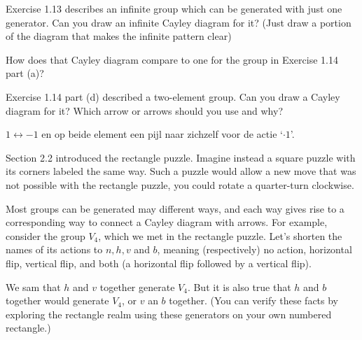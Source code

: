 \documentclass[11pt]{exam}
\begin{document}
\begin{questions}
	\question Exercise 1.13 describes an infinite group which can be generated with just one generator. Can you draw an infinite Cayley diagram for it? (Just draw a portion of the diagram that makes the infinite pattern clear)
	\par How does that Cayley diagram compare to one for the group in Exercise 1.14 part (a)?
	
	\question Exercise 1.14 part (d) described a two-element group. Can you draw a Cayley diagram for it? Which arrow or arrows should you use and why?
	\begin{solution}
		\par $1 \leftrightarrow -1$ en op beide element een pijl naar zichzelf voor de actie `$\cdot 1$'.
	\end{solution}

	\question Section 2.2 introduced the rectangle puzzle. Imagine instead a square puzzle with its corners labeled the same way. Such a puzzle would allow a new move that was not possible with the rectangle puzzle, you could rotate a quarter-turn clockwise.
	
	\question Most groups can be generated may different ways, and each way gives rise to a corresponding way to connect a Cayley diagram with arrows. For example, consider the group $V_4$, which we met in the rectangle puzzle. Let's shorten the names of its actions to $n, h, v$ and $b$, meaning (respectively) no action, horizontal flip, vertical flip, and both (a horizontal flip followed by a vertical flip).
	\par We sam that $h$ and $v$ together generate $V_4$. But it is also true that $h$ and $b$ together would generate $V_4$, or $v$ an $b$ together. (You can verify these facts by exploring the rectangle realm using these generators on your own numbered rectangle.)
	\begin{parts}

\end{parts}
\end{questions}
\end{document}
